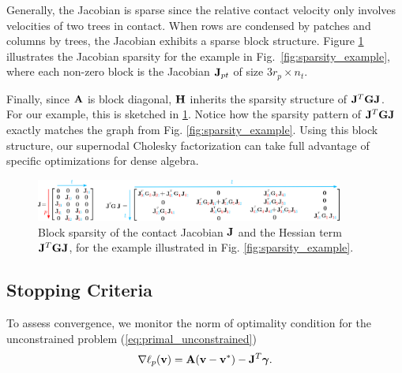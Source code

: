 Generally, the Jacobian is sparse since the relative contact velocity only
involves velocities of two trees in contact. When rows are condensed by patches
and columns by trees, the Jacobian exhibits a sparse block structure. Figure
\ref{fig:JTGJ_schematic} illustrates the Jacobian sparsity for the example in
Fig.~\ref{fig:sparsity_example}, where each non-zero block is the Jacobian
${\mathbf{J}}_{pt}$ of size $3r_p\times n_t$.

Finally, since ${\mathbf{A}}$ is block diagonal, ${\mathbf{H}}$ inherits the sparsity
structure of ${\mathbf{J}}^T{\mathbf{G}}{\mathbf{J}}$. For our example, this is sketched in
\ref{fig:JTGJ_schematic}. Notice how the sparsity pattern of
${\mathbf{J}}^T{\mathbf{G}}{\mathbf{J}}$ exactly matches the graph from Fig.
\ref{fig:sparsity_example}. Using this block structure, our supernodal Cholesky
factorization can take full advantage of specific optimizations for dense
algebra.
\begin{figure}[!h]
	\centering
	\includegraphics[width=0.9\textwidth]{figures/schematics/jacobian_and_JTGJ.png}
	\caption{\label{fig:JTGJ_schematic} 
	Block sparsity of the contact Jacobian ${\mathbf{J}}$ and the Hessian term
	${\mathbf{J}}^T{\mathbf{G}}{\mathbf{J}}$, for the example illustrated in Fig.
	\ref{fig:sparsity_example}.}
\end{figure}


\subsection{Stopping Criteria}
\label{sec:stopping_criteria}

To assess convergence, we monitor the norm of optimality condition for the
unconstrained problem (\ref{eq:primal_unconstrained})
\begin{equation*}
	\nabla\ell_p({\mathbf{v}}) = {\mathbf{A}}({\mathbf{v}}-{\mathbf{v}}^*) - {\mathbf{J}}^T{\bm\gamma}.
\end{equation*}

